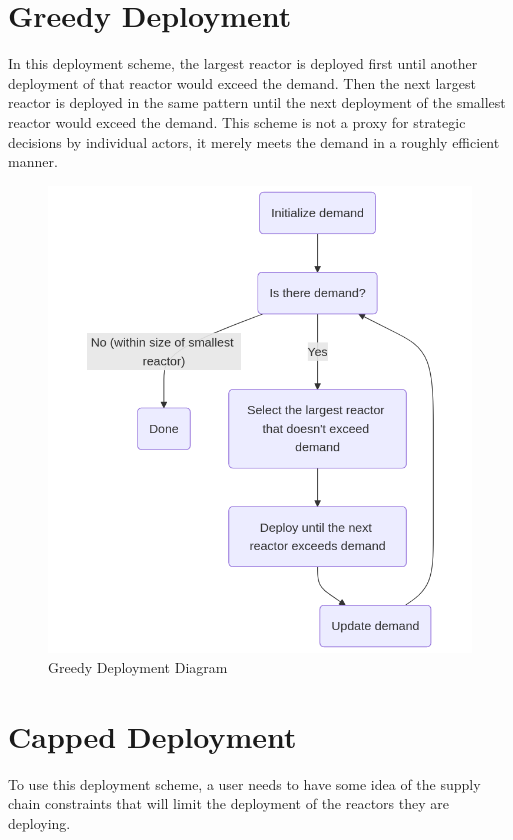 \section{Greedy Deployment}
In this deployment scheme, the largest reactor is deployed first until another
deployment of that reactor would exceed the demand. Then the next largest
reactor is deployed in the same pattern until the next deployment of the
smallest reactor would exceed the demand. This scheme is not a proxy for
strategic decisions by individual actors, it merely meets the demand in a
roughly efficient manner.

\begin{figure}[!htbp]
    \centering
    \includegraphics[scale=0.4]{images/schemes/greedy_diagram.png}
    \caption{Greedy Deployment Diagram}
    \label{fig:greedy_diagram}
\end{figure}



\section{Capped Deployment}
To use this deployment scheme, a user needs to have some idea of the supply chain constraints that will limit the deployment of the reactors they are deploying.

